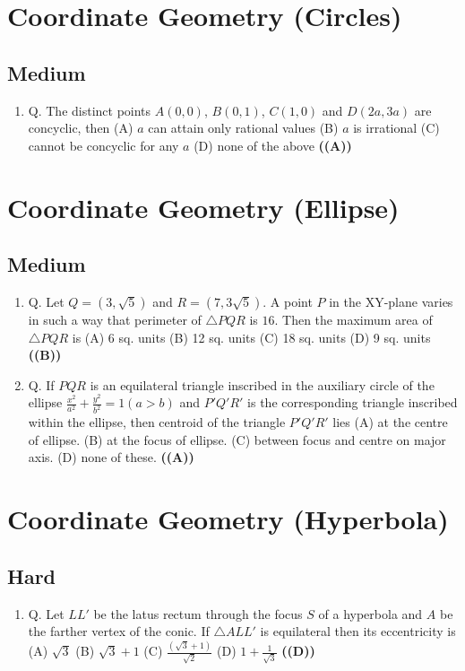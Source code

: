 \documentclass{article}
\begin{document}
\section{Coordinate Geometry (Circles)}
\subsection{Medium}
\begin{enumerate}
\item Q. The distinct points $A(0, 0)$, $B(0, 1)$, $C(1, 0)$ and $D(2a, 3a)$ are concyclic, then
(A) $a$ can attain only rational values
(B) $a$ is irrational
(C) cannot be concyclic for any $a$
(D) none of the above \hfill \textbf{((A))}
\end{enumerate}
\section{Coordinate Geometry (Ellipse)}
\subsection{Medium}
\begin{enumerate}
\item Q. Let $Q = (3, \sqrt{5})$ and $R = (7,3\sqrt{5})$. A point $P$ in the XY-plane varies in such a way that perimeter of $\triangle PQR$ is $16$. Then the maximum area of $\triangle PQR$ is
(A) 6 sq. units
(B) 12 sq. units
(C) 18 sq. units
(D) 9 sq. units \hfill \textbf{((B))}
\item Q. If $PQR$ is an equilateral triangle inscribed in the auxiliary circle of the ellipse $\frac{x^2}{a^2} + \frac{y^2}{b^2} = 1(a > b)$ and $P'Q'R'$ is the corresponding triangle inscribed within the ellipse, then centroid of the triangle $P'Q'R'$ lies
(A) at the centre of ellipse.
(B) at the focus of ellipse.
(C) between focus and centre on major axis.
(D) none of these. \hfill \textbf{((A))}
\end{enumerate}
\section{Coordinate Geometry (Hyperbola)}
\subsection{Hard}
\begin{enumerate}
\item Q. Let $LL'$ be the latus rectum through the focus $S$ of a hyperbola and $A$ be the farther vertex of the conic. If $\triangle ALL'$ is equilateral then its eccentricity is
(A) $\sqrt{3}$
(B) $\sqrt{3}+1$
(C) $\frac{(\sqrt{3}+1)}{\sqrt{2}}$
(D) $1 + \frac{1}{\sqrt{3}}$ \hfill \textbf{((D))}
\end{enumerate}
\end{document}
